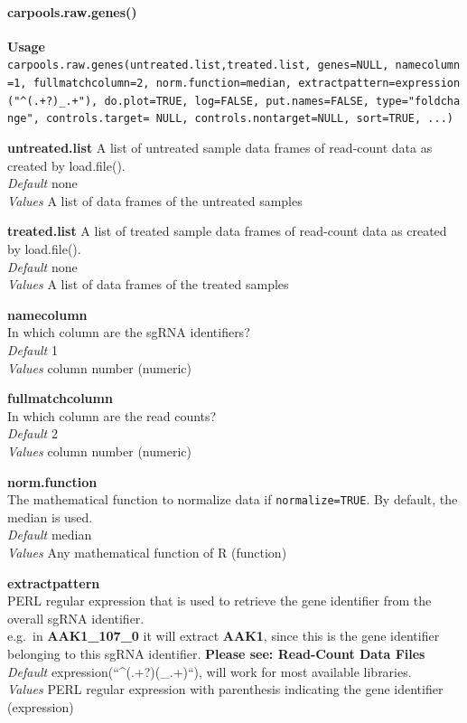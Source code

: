 \documentclass[]{article}
\let\oldparagraph\paragraph
\renewcommand{\paragraph}[1]{\oldparagraph{#1}\mbox{}}
\begin{document}
\paragraph{carpools.raw.genes()}\label{carpools.raw.genes}

\textbf{Usage}
\texttt{carpools.raw.genes(untreated.list,treated.list,\ genes=NULL,\ namecolumn=1,\ fullmatchcolumn=2,\ norm.function=median,\ extractpattern=expression("\^{}(.+?)\_.+"),\ do.plot=TRUE,\ log=FALSE,\ put.names=FALSE,\ type="foldchange",\ controls.target=\ NULL,\ controls.nontarget=NULL,\ sort=TRUE,\ ...)}

\textbf{untreated.list} A list of untreated sample data frames of
read-count data as created by load.file().\\
\emph{Default} none\\
\emph{Values} A list of data frames of the untreated samples

\textbf{treated.list} A list of treated sample data frames of read-count
data as created by load.file().\\
\emph{Default} none\\
\emph{Values} A list of data frames of the treated samples

\textbf{namecolumn}\\
In which column are the sgRNA identifiers?\\
\emph{Default} 1\\
\emph{Values} column number (numeric)

\textbf{fullmatchcolumn}\\
In which column are the read counts?\\
\emph{Default} 2\\
\emph{Values} column number (numeric)

\textbf{norm.function}\\
The mathematical function to normalize data if \texttt{normalize=TRUE}.
By default, the median is used.\\
\emph{Default} median\\
\emph{Values} Any mathematical function of R (function)

\textbf{extractpattern}\\
PERL regular expression that is used to retrieve the gene identifier
from the overall sgRNA identifier.\\
e.g.~in \textbf{AAK1\_107\_0} it will extract \textbf{AAK1}, since this
is the gene identifier belonging to this sgRNA identifier.
\textbf{Please see: Read-Count Data Files}\\
\emph{Default} expression(``\^{}(.+?)(\_.+)``), will work for most
available libraries.\\
\emph{Values} PERL regular expression with parenthesis indicating the
gene identifier (expression)
\end{document}
